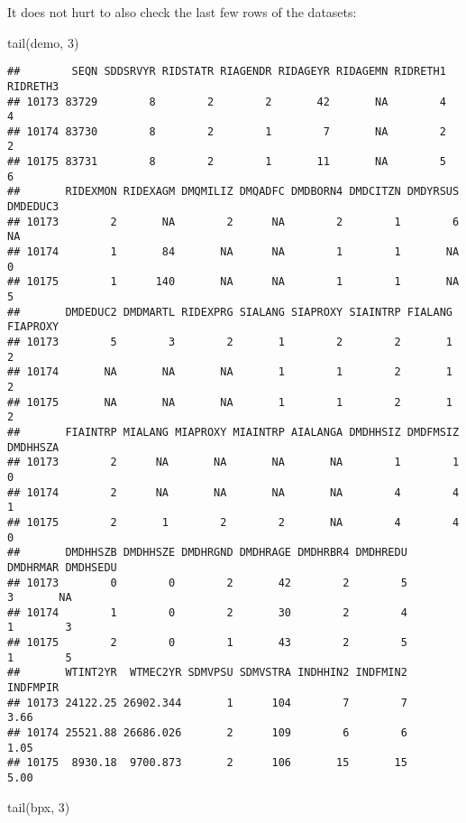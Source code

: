 \documentclass[
]{book}
\newenvironment{Shaded}{\begin{snugshade}}{\end{snugshade}}
\newcommand{\DecValTok}[1]{\textcolor[rgb]{0.00,0.00,0.81}{#1}}
\newcommand{\FunctionTok}[1]{\textcolor[rgb]{0.00,0.00,0.00}{#1}}
\newcommand{\NormalTok}[1]{#1}
\begin{document}
It does not hurt to also check the last few rows of the datasets:

\begin{Shaded}
\begin{Highlighting}[]
\FunctionTok{tail}\NormalTok{(demo, }\DecValTok{3}\NormalTok{)}
\end{Highlighting}
\end{Shaded}

\begin{verbatim}
##        SEQN SDDSRVYR RIDSTATR RIAGENDR RIDAGEYR RIDAGEMN RIDRETH1 RIDRETH3
## 10173 83729        8        2        2       42       NA        4        4
## 10174 83730        8        2        1        7       NA        2        2
## 10175 83731        8        2        1       11       NA        5        6
##       RIDEXMON RIDEXAGM DMQMILIZ DMQADFC DMDBORN4 DMDCITZN DMDYRSUS DMDEDUC3
## 10173        2       NA        2      NA        2        1        6       NA
## 10174        1       84       NA      NA        1        1       NA        0
## 10175        1      140       NA      NA        1        1       NA        5
##       DMDEDUC2 DMDMARTL RIDEXPRG SIALANG SIAPROXY SIAINTRP FIALANG FIAPROXY
## 10173        5        3        2       1        2        2       1        2
## 10174       NA       NA       NA       1        1        2       1        2
## 10175       NA       NA       NA       1        1        2       1        2
##       FIAINTRP MIALANG MIAPROXY MIAINTRP AIALANGA DMDHHSIZ DMDFMSIZ DMDHHSZA
## 10173        2      NA       NA       NA       NA        1        1        0
## 10174        2      NA       NA       NA       NA        4        4        1
## 10175        2       1        2        2       NA        4        4        0
##       DMDHHSZB DMDHHSZE DMDHRGND DMDHRAGE DMDHRBR4 DMDHREDU DMDHRMAR DMDHSEDU
## 10173        0        0        2       42        2        5        3       NA
## 10174        1        0        2       30        2        4        1        3
## 10175        2        0        1       43        2        5        1        5
##       WTINT2YR  WTMEC2YR SDMVPSU SDMVSTRA INDHHIN2 INDFMIN2 INDFMPIR
## 10173 24122.25 26902.344       1      104        7        7     3.66
## 10174 25521.88 26686.026       2      109        6        6     1.05
## 10175  8930.18  9700.873       2      106       15       15     5.00
\end{verbatim}

\begin{Shaded}
\begin{Highlighting}[]
\FunctionTok{tail}\NormalTok{(bpx, }\DecValTok{3}\NormalTok{)}
\end{Highlighting}
\end{Shaded}
\end{document}
